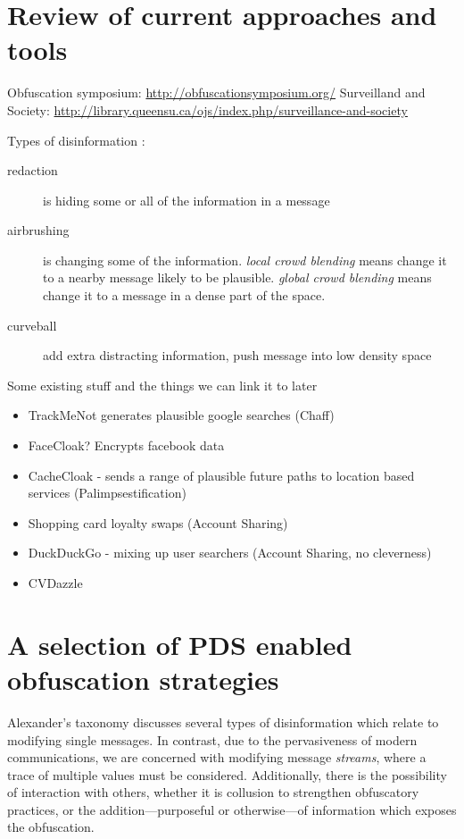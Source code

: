 \documentclass{IOS-Book-Article}     %
\begin{document}
\section{Review of current approaches and tools} 

Obfuscation symposium: \url{http://obfuscationsymposium.org/}
Surveilland and Society:
\url{http://library.queensu.ca/ojs/index.php/surveillance-and-society}

Types of disinformation \cite{alexander2010Disinformation}:
\begin{description}
  \item[redaction] is hiding some or all of the information in a message
  \item[airbrushing] is changing some of the information. \emph{local crowd
  blending} means change it to a nearby message likely to be plausible.
  \emph{global crowd blending} means change it to a message in a dense part of
  the space.
  \item[curveball] add extra distracting information, push message into low
  density space
\end{description}


Some existing stuff and the things we can link it to later

\begin{itemize}
  \item TrackMeNot generates plausible google searches (Chaff)
  \item FaceCloak? Encrypts facebook data
  \item CacheCloak - sends a range of plausible future paths to location based
  services (Palimpsestification)
  \item Shopping card loyalty swaps (Account Sharing)
  \item DuckDuckGo - mixing up user searchers (Account Sharing, no cleverness)
  \item CVDazzle
\end{itemize}





\section{A selection of PDS enabled obfuscation strategies}

Alexander's taxonomy \cite{alexander2010Disinformation} discusses several types
of disinformation which relate to modifying single messages. In contrast, due to
the pervasiveness of modern communications, we are concerned with modifying
message \emph{streams}, where a trace of multiple values must be considered.
Additionally, there is the possibility of interaction with others, whether it is
collusion to strengthen obfuscatory practices, or the addition---purposeful or
otherwise---of information which exposes the obfuscation.
\end{document}
